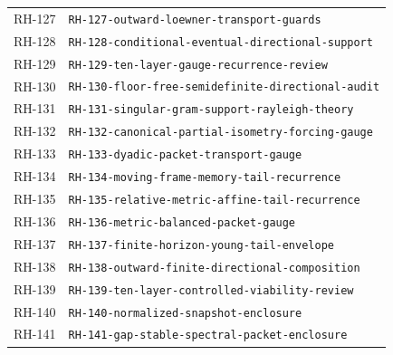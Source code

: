 \begin{longtable}{r >{\raggedright\arraybackslash}p{}}
RH-127 & \texttt{RH-\allowbreak{}127-\allowbreak{}outward-\allowbreak{}loewner-\allowbreak{}transport-\allowbreak{}guards}\\
RH-128 & \texttt{RH-\allowbreak{}128-\allowbreak{}conditional-\allowbreak{}eventual-\allowbreak{}directional-\allowbreak{}support}\\
RH-129 & \texttt{RH-\allowbreak{}129-\allowbreak{}ten-\allowbreak{}layer-\allowbreak{}gauge-\allowbreak{}recurrence-\allowbreak{}review}\\
RH-130 & \texttt{RH-\allowbreak{}130-\allowbreak{}floor-\allowbreak{}free-\allowbreak{}semidefinite-\allowbreak{}directional-\allowbreak{}audit}\\
RH-131 & \texttt{RH-\allowbreak{}131-\allowbreak{}singular-\allowbreak{}gram-\allowbreak{}support-\allowbreak{}rayleigh-\allowbreak{}theory}\\
RH-132 & \texttt{RH-\allowbreak{}132-\allowbreak{}canonical-\allowbreak{}partial-\allowbreak{}isometry-\allowbreak{}forcing-\allowbreak{}gauge}\\
RH-133 & \texttt{RH-\allowbreak{}133-\allowbreak{}dyadic-\allowbreak{}packet-\allowbreak{}transport-\allowbreak{}gauge}\\
RH-134 & \texttt{RH-\allowbreak{}134-\allowbreak{}moving-\allowbreak{}frame-\allowbreak{}memory-\allowbreak{}tail-\allowbreak{}recurrence}\\
RH-135 & \texttt{RH-\allowbreak{}135-\allowbreak{}relative-\allowbreak{}metric-\allowbreak{}affine-\allowbreak{}tail-\allowbreak{}recurrence}\\
RH-136 & \texttt{RH-\allowbreak{}136-\allowbreak{}metric-\allowbreak{}balanced-\allowbreak{}packet-\allowbreak{}gauge}\\
RH-137 & \texttt{RH-\allowbreak{}137-\allowbreak{}finite-\allowbreak{}horizon-\allowbreak{}young-\allowbreak{}tail-\allowbreak{}envelope}\\
RH-138 & \texttt{RH-\allowbreak{}138-\allowbreak{}outward-\allowbreak{}finite-\allowbreak{}directional-\allowbreak{}composition}\\
RH-139 & \texttt{RH-\allowbreak{}139-\allowbreak{}ten-\allowbreak{}layer-\allowbreak{}controlled-\allowbreak{}viability-\allowbreak{}review}\\
RH-140 & \texttt{RH-\allowbreak{}140-\allowbreak{}normalized-\allowbreak{}snapshot-\allowbreak{}enclosure}\\
RH-141 & \texttt{RH-\allowbreak{}141-\allowbreak{}gap-\allowbreak{}stable-\allowbreak{}spectral-\allowbreak{}packet-\allowbreak{}enclosure}\\

\end{longtable}
